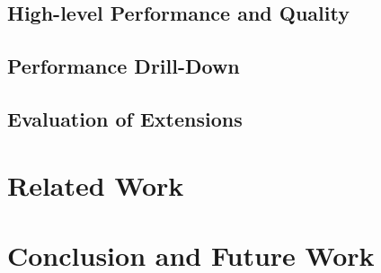 \documentclass{vldb}
\begin{document}
\subsection{High-level Performance and Quality}

\subsection{Performance Drill-Down}

\subsection{Evaluation of Extensions}



\section{Related Work}



\section{Conclusion and Future Work}



{
\scriptsize


}
\end{document}
